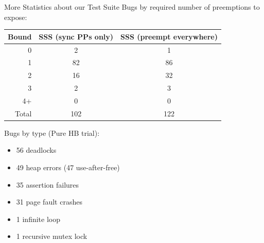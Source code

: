 \documentclass[xcolor=dvipsnames]{beamer}
\begin{document}
\begin{frame}{More Statistics about our Test Suite}
	Bugs by required number of preemptions to expose:
	\begin{center}
        	\footnotesize
        \begin{tabular}{r|c|c}
		{\bf Bound} & {\bf SSS (sync PPs only)} & {\bf SSS (preempt everywhere)} \\
                \hline
                0       & 2     & 1     \\
                1       & 82    & 86    \\
                2       & 16        & 32    \\
                3       & 2     & 3     \\
                4+      & 0     & 0     \\
                \hline
                Total   & 102       & 122   \\
        \end{tabular}
	\end{center}
	\linegap
	
	Bugs by type (Pure HB trial):
	\begin{itemize}
		\item 56 deadlocks
		\item 49 heap errors (47 use-after-free)
		\item 35 assertion failures
		\item 31 page fault crashes
		\item 1 infinite loop
		\item 1 recursive mutex lock
	\end{itemize}
\end{frame}
\end{document}
